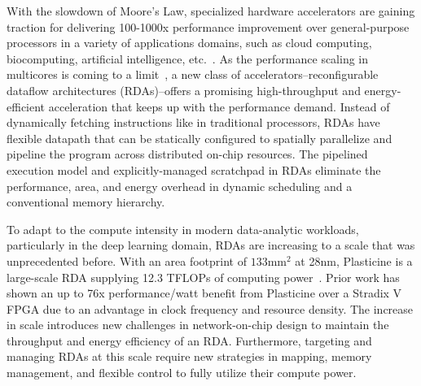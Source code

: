 
With the slowdown of Moore’s Law, specialized hardware accelerators are gaining traction for delivering 100-1000x performance improvement over general-purpose processors in a variety of applications domains, such as cloud computing, biocomputing, 
artificial intelligence, etc.~\cite{fpgacloudsurvey,bioaccel,genomicaccel}.
As the performance scaling in multicores is coming to a limit~\cite{multicorescale}, a new class of accelerators--reconfigurable dataflow architectures (RDAs)--offers a promising high-throughput and energy-efficient acceleration that keeps up with the performance demand.
Instead of dynamically fetching instructions like in traditional processors, RDAs have flexible datapath  that can be statically configured to spatially parallelize and pipeline the program across
distributed on-chip resources. 
The pipelined execution model and explicitly-managed scratchpad in RDAs eliminate the performance, area, and energy overhead in dynamic scheduling and a conventional memory hierarchy.

To adapt to the compute intensity in modern data-analytic workloads, particularly in the deep learning domain, RDAs are increasing to a scale that was unprecedented before.
With an area footprint of $133\text{mm}^2$ at 28nm, 
Plasticine is a large-scale RDA supplying 12.3 TFLOPs of computing power~\cite{plasticine}.
Prior work has shown an up to 76x performance/watt benefit from Plasticine over a Stradix V FPGA 
due to an advantage in clock frequency and resource density.
The increase in scale introduces new challenges in network-on-chip design to maintain 
the throughput and energy efficiency of an RDA.
Furthermore, targeting and managing RDAs at this scale require new strategies in mapping,  memory management, and flexible control to fully utilize their compute power. 

